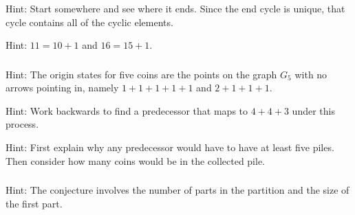 \subsubsection*{ \answers}
\begin{apart}
    \item Hint: Start somewhere and see where it ends.  Since the end cycle is unique, that cycle contains all of the cyclic elements.
    \item Hint: $11 = 10+1$ and $16=15+1$.
\end{apart}

\subsubsection*{ \answers}
\begin{apart}
    \item Hint: The origin states for five coins are the points on the graph $G_5$ with no arrows pointing in, namely $1+1+1+1+1$ and $2+1+1+1$.
    \item Hint: Work backwards to find a predecessor that maps to $4+4+3$ under this process.
    \item Hint: First explain why any predecessor would have to have at least five piles.  Then consider how many coins would be in the collected pile.
\end{apart}

\subsubsection*{ \answers}
Hint: The conjecture involves the number of parts in the partition and the size of the first part.


